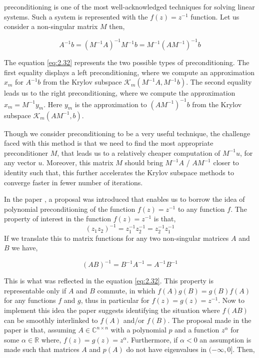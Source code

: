 preconditioning is one of the most well-acknowledged techniques for solving linear systems. Such a system is represented with the $f(z) = z^{-1}$ function. Let us consider a non-singular matrix $M$ then,

\begin{equation}
    A^{-1}b = (M^{-1}A)^{-1}M^{-1}b = M^{-1}(AM^{-1})^{-1}b
    \label{eq:2.32}
\end{equation}

The equation \ref{eq:2.32} represents the two possible types of preconditioning. The first equality displays a left preconditioning, where we compute an approximation $x_{m}$ for $A^{-1}b$ from the Krylov subspace $\mathcal{K}_{m}(M^{-1}A, M^{-1}b)$. The second equality leads us to the right preconditioning, where we compute the approximation $x_{m} = M^{-1}y_{m}$. Here $y_{m}$ is the approximation to $(AM^{-1})^{-1}b$ from the Krylov subspace $\mathcal{K}_{m}(AM^{-1}, b)$.

Though we consider preconditioning to be a very useful technique, the challenge faced with this method is that we need to find the most appropriate preconditioner $M$, that leads us to a relatively cheaper computation of $M^{-1}u$, for any vector $u$. Moreover, this matrix $M$ should bring $M^{-1}A$ / $AM^{-1}$ closer to identity such that, this further accelerates the Krylov subspace methods to converge faster in fewer number of iterations.

In the paper \cite{49}, a proposal was introduced that enables us to borrow the idea of polynomial preconditioning of the function $f(z)=z^{-1}$ to any function $f$. The property of interest in the function $f(z) = z^{-1}$ is that,
\[
    (z_{1}z_{2})^{-1} = z_{1}^{-1}z_{2}^{-1} = z_{2}^{-1}z_{1}^{-1}
\]
If we translate this to matrix functions for any two non-singular matrices $A$ and $B$ we have,

\[
    (AB)^{-1} =B^{-1}A^{-1} = A^{-1}B^{-1}
\]

This is what was reflected in the equation \ref{eq:2.32}. This property is representable only if $A$ and $B$ commute, in which $f(A)g(B) = g(B)f(A)$ for any functions $f$ and $g$, thus in particular for $f(z) = g(z) = z^{-1}$. Now to implement this idea the paper \cite{49} suggests identifying the situation where $f(AB)$ can be smoothly interlinked to $f(A)$ and/or $f(B)$. The proposal made in the paper is that, assuming $A \in \mathbb{C}^{n \times n}$ with a polynomial $p$ and a function $z^{\alpha}$ for some $\alpha \in \mathbb{R}$ where, $f(z) = g(z) = z^{\alpha}$. Furthermore, if $\alpha < 0$ an assumption is made such that matrices $A$ and $p(A)$ do not have eigenvalues in $(-\infty, 0]$. Then,

